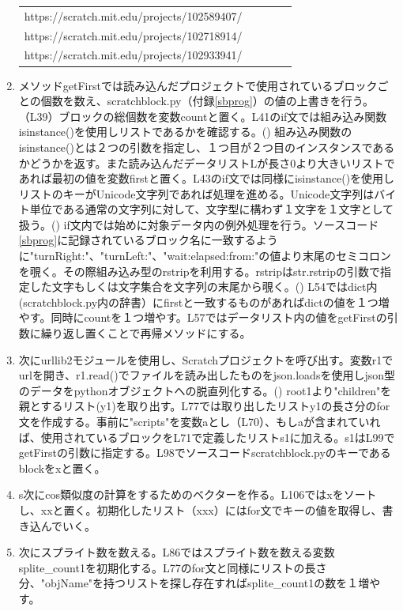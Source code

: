 \documentclass[a4paper,10pt,onecolumn,oneside,openany]{jsbook}
\begin{document}
\begin{enumerate}
\begin{table}[h]
\begin{center}
\begin{tabular}{lclcl}
https://scratch.mit.edu/projects/102589407/ \\
https://scratch.mit.edu/projects/102718914/ \\
https://scratch.mit.edu/projects/102933941/ \\
\end{tabular}
\end{center}
\end{table}
\item メソッドgetFirstでは読み込んだプロジェクトで使用されているブロックごとの個数を数え、scratchblock.py（付録\ref{sbprog}）の値の上書きを行う。（L39）ブロックの総個数を変数countと置く。L41のif文では組み込み関数isinstance()を使用しリストであるかを確認する。(\cite{isinstance}) 組み込み関数のisinstance()とは２つの引数を指定し、１つ目が２つ目のインスタンスであるかどうかを返す。また読み込んだデータリストLが長さ0より大きいリストであれば最初の値を変数firstと置く。L43のif文では同様にisinstance()を使用しリストのキーがUnicode文字列であれば処理を進める。Unicode文字列はバイト単位である通常の文字列に対して、文字型に構わず１文字を１文字として扱う。(\cite{unicode}) if文内では始めに対象データ内の例外処理を行う。ソースコード\ref{sbprog}に記録されているブロック名に一致するように"turnRight:"、"turnLeft:"、"wait:elapsed:from:"の値より末尾のセミコロンを覗く。その際組み込み型のrstripを利用する。rstripはstr.rstripの引数で指定した文字もしくは文字集合を文字列の末尾から覗く。(\cite{rstrip}) L54ではdict内(scratchblock.py内の辞書）にfirstと一致するものがあればdictの値を１つ増やす。同時にcountを１つ増やす。L57ではデータリスト内の値をgetFirstの引数に繰り返し置くことで再帰メソッドにする。
\item 次にurllib2モジュールを使用し、Scratchプロジェクトを呼び出す。変数r1でurlを開き、r1.read()でファイルを読み出したものをjson.loadsを使用しjson型のデータをpythonオブジェクトへの脱直列化する。(\cite{loads})  root1より"children"を親とするリスト(y1)を取り出す。L77では取り出したリストy1の長さ分のfor文を作成する。事前に"scripts"を変数aとし（L70）、もしaが含まれていれば、使用されているブロックをL71で定義したリストs1に加える。s1はL99でgetFirstの引数に指定する。L98でソースコードscratchblock.pyのキーであるblockをxと置く。
\item s次にcos類似度の計算をするためのベクターを作る。L106ではxをソートし、xxと置く。初期化したリスト（xxx）にはfor文でキーの値を取得し、書き込んでいく。
\item 次にスプライト数を数える。L86ではスプライト数を数える変数splite\_count1を初期化する。L77のfor文と同様にリストの長さ分、"objName"を持つリストを探し存在すればsplite\_count1の数を１増やす。

\end{enumerate}
\end{document}
